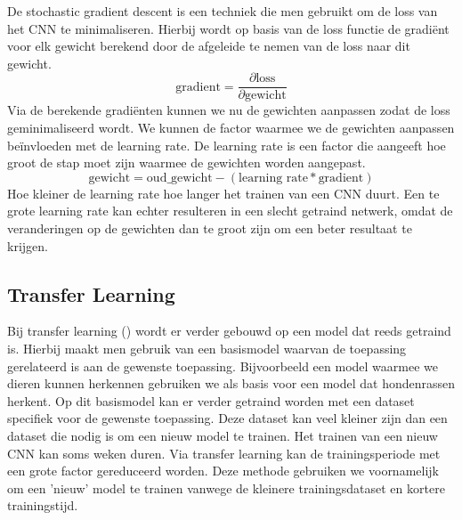 De stochastic gradient descent is een techniek die men gebruikt om de loss van het CNN te minimaliseren.
Hierbij wordt op basis van de loss functie de gradi\"ent voor elk gewicht berekend door de afgeleide te nemen van de loss naar dit gewicht.
\begin{equation}
	\textrm{gradient}  = \frac{\partial \textrm{loss}}{\partial \textrm{gewicht}}
\end{equation}
Via de berekende gradi\"enten kunnen we nu de gewichten aanpassen zodat de loss geminimaliseerd wordt.
We kunnen de factor waarmee we de gewichten aanpassen be\"invloeden met de learning rate.
De learning rate is een factor die aangeeft hoe groot de stap moet zijn waarmee de gewichten worden aangepast.
\begin{equation}
	\textrm{gewicht} = \textrm{oud\_gewicht} - (\textrm{learning rate} * \textrm{gradient})
\end{equation}
Hoe kleiner de learning rate hoe langer het trainen van een CNN duurt.
Een te grote learning rate kan echter resulteren in een slecht getraind netwerk, omdat de veranderingen op de gewichten dan te groot zijn om een beter resultaat te krijgen.

\subsection{Transfer Learning}
Bij transfer learning (\cite{Geiger_IJRR_2013}) wordt er verder gebouwd op een model dat reeds getraind is.
Hierbij maakt men gebruik van een basismodel waarvan de toepassing gerelateerd is aan de gewenste toepassing.
Bijvoorbeeld een model waarmee we dieren kunnen herkennen gebruiken we als basis voor een model dat hondenrassen herkent.
Op dit basismodel kan er verder getraind worden met een dataset specifiek voor de gewenste toepassing.
Deze dataset kan veel kleiner zijn dan een dataset die nodig is om een nieuw model te trainen.
Het trainen van een nieuw CNN kan soms weken duren.
Via transfer learning kan de trainingsperiode met een grote factor gereduceerd worden.
Deze methode gebruiken we voornamelijk om een 'nieuw' model te trainen vanwege de kleinere trainingsdataset en kortere trainingstijd.

